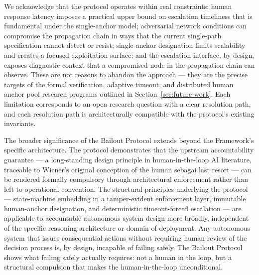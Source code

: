 We acknowledge that the protocol operates within real constraints: human response latency imposes a practical upper bound on escalation timeliness that is fundamental under the single-anchor model; adversarial network conditions can compromise the propagation chain in ways that the current single-path specification cannot detect or resist; single-anchor designation limits scalability and creates a focused exploitation surface; and the escalation interface, by design, exposes diagnostic context that a compromised node in the propagation chain can observe. These are not reasons to abandon the approach --- they are the precise targets of the formal verification, adaptive timeout, and distributed human anchor pool research programs outlined in Section~\ref{sec:future-work}. Each limitation corresponds to an open research question with a clear resolution path, and each resolution path is architecturally compatible with the protocol's existing invariants.

The broader significance of the Bailout Protocol extends beyond the \bxthree{} Framework's specific architecture. The protocol demonstrates that the upstream accountability guarantee --- a long-standing design principle in human-in-the-loop AI literature, traceable to Wiener's original conception of the human sebagai last resort \cite{wiener1954human} --- can be rendered formally compulsory through architectural enforcement rather than left to operational convention. The structural principles underlying the protocol --- state-machine embedding in a tamper-evident enforcement layer, immutable human-anchor designation, and deterministic timeout-forced escalation --- are applicable to accountable autonomous system design more broadly, independent of the specific reasoning architecture or domain of deployment. Any autonomous system that issues consequential actions without requiring human review of the decision process is, by design, incapable of failing safely. The Bailout Protocol shows what failing safely actually requires: not a human in the loop, but a structural compulsion that makes the human-in-the-loop unconditional.
